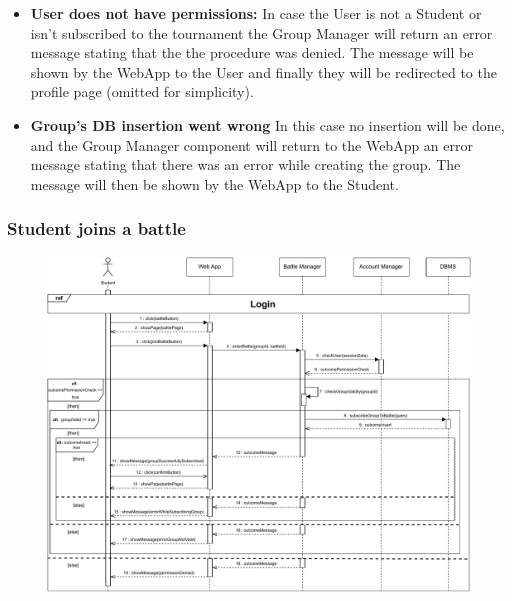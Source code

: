 \documentclass{article}
\begin{document}
{        \begin{itemize}
            \item \textbf{User does not have permissions:} In case the User is not a Student
            or isn't subscribed to the tournament the Group Manager will return an error message 
            stating that the the procedure was denied. The message will be shown 
            by the WebApp to the User and finally they will be
            redirected to the profile page (omitted for simplicity).
            \item \textbf{Group's DB insertion went wrong} In this case no insertion will
            be done, and the Group Manager component will return to the WebApp 
            an error message stating that there was an error while creating the group. 
            The message will then be shown by the WebApp to the Student.
        \end{itemize}


    \subsubsection{Student joins a battle}
        \begin{figure}[H]
            \centering
            \hspace*{-2.1cm}\includegraphics[scale=0.7]{Sequence/Sequence10DD.pdf}
            \caption{}
            \label{fig:Sequence10DD}
        \end{figure}
        

}
\end{document}
